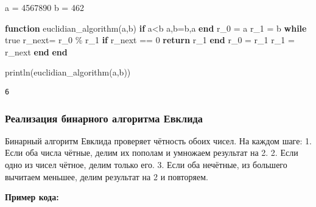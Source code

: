 \documentclass[
]{article}
\newenvironment{Shaded}{}{}
\newcommand{\ConstantTok}[1]{\textcolor[rgb]{0.53,0.00,0.00}{#1}}
\newcommand{\ControlFlowTok}[1]{\textcolor[rgb]{0.00,0.44,0.13}{\textbf{#1}}}
\newcommand{\FloatTok}[1]{\textcolor[rgb]{0.25,0.63,0.44}{#1}}
\newcommand{\FunctionTok}[1]{\textcolor[rgb]{0.02,0.16,0.49}{#1}}
\newcommand{\KeywordTok}[1]{\textcolor[rgb]{0.00,0.44,0.13}{\textbf{#1}}}
\newcommand{\NormalTok}[1]{#1}
\newcommand{\OperatorTok}[1]{\textcolor[rgb]{0.40,0.40,0.40}{#1}}
\begin{document}
\begin{Shaded}
\begin{Highlighting}[]
\NormalTok{a }\OperatorTok{=} \FloatTok{4567890}
\NormalTok{b }\OperatorTok{=} \FloatTok{462}

\KeywordTok{function} \FunctionTok{euclidian\_algorithm}\NormalTok{(a,b)}
    \ControlFlowTok{if}\NormalTok{ a}\OperatorTok{\textless{}}\NormalTok{b}
\NormalTok{        a,b}\OperatorTok{=}\NormalTok{b,a}
    \ControlFlowTok{end}
\NormalTok{    r\_0 }\OperatorTok{=}\NormalTok{ a}
\NormalTok{    r\_1 }\OperatorTok{=}\NormalTok{ b }
    \ControlFlowTok{while} \ConstantTok{true}
\NormalTok{        r\_next}\OperatorTok{=}\NormalTok{ r\_0 }\OperatorTok{\%}\NormalTok{ r\_1}
        \ControlFlowTok{if}\NormalTok{ r\_next }\OperatorTok{==} \FloatTok{0}
            \ControlFlowTok{return}\NormalTok{ r\_1}
        \ControlFlowTok{end}
\NormalTok{        r\_0 }\OperatorTok{=}\NormalTok{ r\_1}
\NormalTok{        r\_1 }\OperatorTok{=}\NormalTok{ r\_next}
    \ControlFlowTok{end}
\KeywordTok{end}

\FunctionTok{println}\NormalTok{(}\FunctionTok{euclidian\_algorithm}\NormalTok{(a,b))}
\end{Highlighting}
\end{Shaded}

\begin{verbatim}
6
\end{verbatim}

\subsubsection{Реализация бинарного алгоритма
Евклида}\label{ux440ux435ux430ux43bux438ux437ux430ux446ux438ux44f-ux431ux438ux43dux430ux440ux43dux43eux433ux43e-ux430ux43bux433ux43eux440ux438ux442ux43cux430-ux435ux432ux43aux43bux438ux434ux430}

Бинарный алгоритм Евклида проверяет чётность обоих чисел. На каждом
шаге: 1. Если оба числа чётные, делим их пополам и умножаем результат на
2. 2. Если одно из чисел чётное, делим только его. 3. Если оба нечётные,
из большего вычитаем меньшее, делим результат на 2 и повторяем.

\textbf{Пример кода:}
\end{document}
